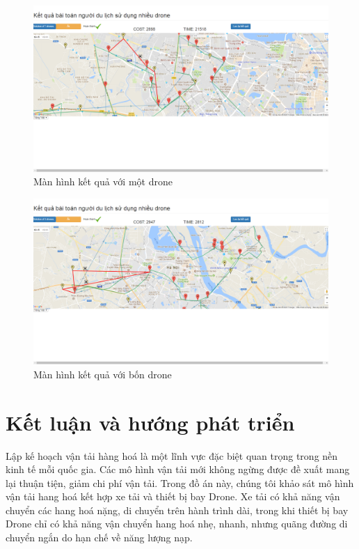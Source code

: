\documentclass[a4paper,12pt]{report}
\begin{document}
\begin{figure}

\includegraphics[scale=0.41]{screen/solution1.png}
\caption{Màn hình kết quả với một drone}
\label{solution1}
\end{figure}
\begin{figure}

\includegraphics[scale=0.41]{screen/solution2.png}
\caption{Màn hình kết quả với bốn drone}
\label{solution2}
\end{figure}
\chapter*{Kết luận và hướng phát triển}
Lập kế hoạch vận tải hàng hoá là một lĩnh vực đặc biệt quan trọng trong nền kinh tế mỗi quốc gia. Các mô hình vận tải mới không ngừng được đề xuất mang lại thuận tiện, giảm chi phí vận tải. Trong đồ án này, chúng tôi khảo sát mô hình vận tải hang hoá kết hợp xe tải và thiết bị bay Drone. Xe tải có khả năng vận chuyển các hang hoá nặng, di chuyển trên hành trình dài, trong khi thiết bị bay Drone chỉ có khả năng vận chuyển hang hoá nhẹ, nhanh, nhưng quãng đường di chuyển ngắn do hạn chế về năng lượng nạp. 
\end{document}

